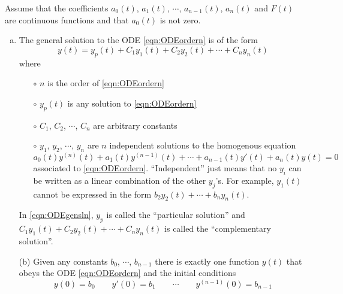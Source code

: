 \begin{theorem}\label{thm:odeMain}
Assume that the coefficients $a_0(t)$, $a_1(t)$, $\cdots$, $a_{n-1}(t)$, 
$a_n(t)$ and $F(t)$ are continuous functions and that 
$a_0(t)$ is not zero.

\begin{enumerate}[(a)]
\item %
The general solution to the ODE \eqref{eqn:ODEordern} is of the form
\begin{equation}\label{eqn:ODEgensln}
y(t)=y_p(t)+ C_1y_1(t)+C_2y_2(t)+\cdots+C_n y_n(t)
\end{equation}
where 
\begin{itemize}\itemsep1pt \parskip0pt  %
\item[$\circ$] $n$ is the order of \eqref{eqn:ODEordern}
\item[$\circ$] $y_p(t)$ is any solution to \eqref{eqn:ODEordern}
\item[$\circ$] $C_1$, $C_2$, $\cdots$, $C_n$ are arbitrary constants
\item[$\circ$] $y_1$, $y_2$, $\cdots$, $y_n$ are $n$ independent solutions
to the homogenous equation 
\begin{equation*}
a_0(t) y^{(n)}(t) + a_1(t) y^{(n-1)}(t)+\cdots+a_{n-1}(t) y'(t) +a_n(t)y(t)=0
\end{equation*}
associated to \eqref{eqn:ODEordern}.
``Independent'' just means that no $y_i$ can be written as a linear combination
of the other $y_j$'s. For example, $y_1(t)$ cannot be expressed in the form
$b_2y_2(t)+\cdots+b_ny_n(t)$. 
\end{itemize}
In \eqref{eqn:ODEgensln}, $y_p$ is called the ``particular solution'' and 
$C_1y_1(t)+C_2y_2(t)+\cdots+C_n y_n(t)$ is called the 
``complementary solution''.

\end{enumerate}
\end{theorem}

\addtocounter{theorem}{-1}
\begin{theorem}[continued]
\begin{enumerate}[(a)]

\item[(b)] %
Given any constants $b_0$, $\cdots$, $b_{n-1}$ there is exactly
one function $y(t)$ that obeys the ODE \eqref{eqn:ODEordern} and the initial
conditions
\begin{equation*}
y(0)=b_0\qquad y'(0)=b_1\qquad \cdots\qquad y^{(n-1)}(0)=b_{n-1}
\end{equation*}
\end{enumerate}
\end{theorem}

